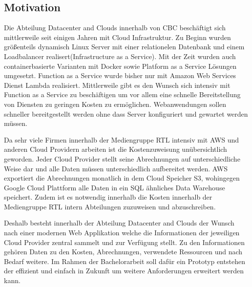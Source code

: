 \subsection{Motivation}
\label{Motivation}
Die Abteilung Datacenter and Clouds innerhalb von CBC beschäftigt sich mittlerweile seit einigen Jahren mit Cloud Infrastruktur.
Zu Beginn wurden größenteils dynamisch Linux Server mit einer relationelen Datenbank und einem Loadbalancer realisert(Infrastructure as a Service).
Mit der Zeit wurden auch containerbasierte Varianten mit Docker sowie Platform as a Service Lösungen umgesetzt.  Function as a Service wurde
bisher nur mit Amazon Web Services Dienst Lambda realisiert. Mittlerweile gibt es den Wunsch sich intensiv
mit Function as a Service zu beschäftigen um vor allem eine schnelle Bereitstellung von Diensten zu geringen Kosten zu ermöglichen.
Webanwendungen sollen schneller bereitgestellt werden ohne dass Server konfiguriert und gewartet werden müssen.

Da sehr viele Firmen innerhalb der Mediengruppe RTL intensiv mit AWS und anderen Cloud Providern arbeiten ist die Kostenzuweisung unübersichtlich geworden.
Jeder Cloud Provider stellt seine Abrechnungen auf unterschiedliche Weise dar und alle Daten müssen unterschiedlich aufbereitet werden.
AWS exportiert die Abrechnungen monatlich in dem Cloud Speicher S3, wohingegen Google Cloud Plattform alle Daten in ein SQL ähnliches Data Warehouse speichert.
Zudem ist es notwendig innerhalb die Kosten innerhalb der Mediengruppe RTL intern Abteilungen zuzuweisen und abzuschreiben.

Deshalb besteht innerhalb der Abteilung Datacenter and Clouds der Wunsch nach einer modernen Web Applikation welche die
Informationen der jeweiligen Cloud Provider zentral sammelt und zur Verfügung stellt. Zu den Informationen gehören Daten zu den Kosten, Abrechnungen, verwendete Ressourcen und nach Bedarf weitere.
 Im Rahmen der Bachelorarbeit soll dafür ein Prototyp entstehen der effizient und einfach in Zukunft um weitere Anforderungen erweitert
werden kann.
